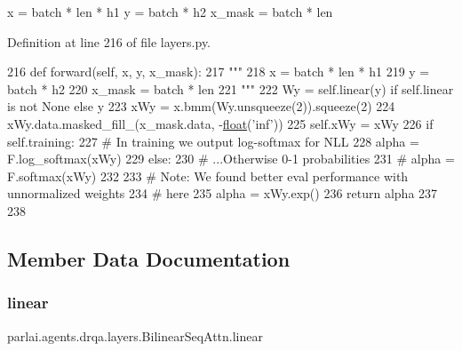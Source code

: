 \begin{DoxyVerb}x = batch * len * h1
y = batch * h2
x_mask = batch * len
\end{DoxyVerb}
 

Definition at line 216 of file layers.\+py.


\begin{DoxyCode}
216     \textcolor{keyword}{def }forward(self, x, y, x\_mask):
217         \textcolor{stringliteral}{"""}
218 \textcolor{stringliteral}{        x = batch * len * h1}
219 \textcolor{stringliteral}{        y = batch * h2}
220 \textcolor{stringliteral}{        x\_mask = batch * len}
221 \textcolor{stringliteral}{        """}
222         Wy = self.linear(y) \textcolor{keywordflow}{if} self.linear \textcolor{keywordflow}{is} \textcolor{keywordflow}{not} \textcolor{keywordtype}{None} \textcolor{keywordflow}{else} y
223         xWy = x.bmm(Wy.unsqueeze(2)).squeeze(2)
224         xWy.data.masked\_fill\_(x\_mask.data, -\hyperlink{namespaceprojects_1_1controllable__dialogue_1_1make__control__dataset_aa2b7207688c641dbc094ab44eca27113}{float}(\textcolor{stringliteral}{'inf'}))
225         self.xWy = xWy
226         \textcolor{keywordflow}{if} self.training:
227             \textcolor{comment}{# In training we output log-softmax for NLL}
228             alpha = F.log\_softmax(xWy)
229         \textcolor{keywordflow}{else}:
230             \textcolor{comment}{# ...Otherwise 0-1 probabilities}
231             \textcolor{comment}{# alpha = F.softmax(xWy)}
232 
233             \textcolor{comment}{# Note: We found better eval performance with unnormalized weights}
234             \textcolor{comment}{#       here}
235             alpha = xWy.exp()
236         \textcolor{keywordflow}{return} alpha
237 
238 
\end{DoxyCode}


\subsection{Member Data Documentation}
\mbox{\label{classparlai_1_1agents_1_1drqa_1_1layers_1_1BilinearSeqAttn_a9ec3eb5a5a3f38a5826b7dc02abbe925}} 
\subsubsection{\texorpdfstring{linear}{linear}}
{\footnotesize\ttfamily parlai.\+agents.\+drqa.\+layers.\+Bilinear\+Seq\+Attn.\+linear}



